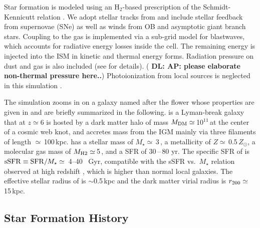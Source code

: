 \IfFileExists{emulateapjlegacy.cls}{\documentclass[iop]{emulateapjlegacy}}{\documentclass[iop]{emulateapj}}
\newcommand{\AP}[1]{({\bf \color{apcolor} AP: #1})}
\newcommand{\DL}[1]{({\bf \color{dlcolor} DL: #1})}
\newcommand{\MM}[1]{({\bf \color{mmcolor} MM: #1})}
\begin{document}
Star formation is modeled using an H$_2$-based prescription of the Schmidt-Kennicutt relation \citep{Krumholz09a}. We adopt stellar tracks from  and include stellar feedback from supernovae (SNe) 
   as well as winds from OB and asymptotic giant branch stars.
Coupling to the gas is implemented via a sub-grid model for blastwaves, which accounts for radiative energy losses inside the cell. The remaining energy is injected into the ISM in kinetic and thermal energy forms. Radiation pressure on dust and gas is also included (see \citealt{Pallottini17a} for details).  
\DL{AP: please elaborate non-thermal pressure here..}
Photoionization from local sources is neglected in this simulation
\citep[see][for its effect]{pallottini:2019,decataldo:2019}. 

The simulation zooms in on a galaxy named
   after the flower 
\flower whose properties are given in 
      \citet{Pallottini17a} 
and are briefly summarized in the following. \flower is a Lyman-break galaxy 
that at $z\simeq 6$ is hosted by a dark matter halo of mass $M_{\rm
  DM}\simeq$\,10$^{11}$\,\Msun at the center of a cosmic web knot, and
accretes mass from the IGM mainly via three filaments of length
$\simeq$\,100\,kpc. \flower has a stellar mass of
$M_\star\simeq$\,3\,\Msun, a metallicity of
$Z\simeq$\,0.5\,$Z_{\odot}$, a molecular gas mass of $M_{\rm
  H2}\simeq$\,5\,\Msun, and a SFR of
   30\,--\,80\,\Msun\,yr\pmOne. 
The specific SFR of \flower is ${\rm sSFR} \equiv {\rm SFR}/M_{\star}
\simeq$~4--40 ~Gyr\pmOne, compatible with the sSFR vs.\ $M_{\star}$
relation observed at high redshift \citep{Jiang2016}, which is higher
than normal local galaxies. The effective stellar radius of \flower
is $\sim$0.5\,kpc and the dark matter virial radius is $r_{\rm
  200}\simeq$\,15\,kpc. 

\subsection{Star Formation History} \label{sec:sfh}
\end{document}
